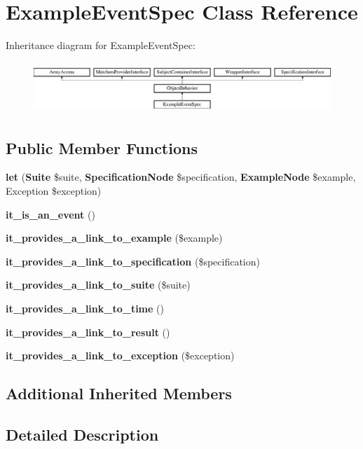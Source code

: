 \section{Example\+Event\+Spec Class Reference}
\label{classspec_1_1_php_spec_1_1_event_1_1_example_event_spec}
Inheritance diagram for Example\+Event\+Spec\+:\begin{figure}[H]
\begin{center}
\leavevmode
\includegraphics[height=1.953488cm]{classspec_1_1_php_spec_1_1_event_1_1_example_event_spec}
\end{center}
\end{figure}
\subsection*{Public Member Functions}
\begin{DoxyCompactItemize}
\item 
{\bf let} ({\bf Suite} \$suite, {\bf Specification\+Node} \$specification, {\bf Example\+Node} \$example, Exception \$exception)
\item 
{\bf it\+\_\+is\+\_\+an\+\_\+event} ()
\item 
{\bf it\+\_\+provides\+\_\+a\+\_\+link\+\_\+to\+\_\+example} (\$example)
\item 
{\bf it\+\_\+provides\+\_\+a\+\_\+link\+\_\+to\+\_\+specification} (\$specification)
\item 
{\bf it\+\_\+provides\+\_\+a\+\_\+link\+\_\+to\+\_\+suite} (\$suite)
\item 
{\bf it\+\_\+provides\+\_\+a\+\_\+link\+\_\+to\+\_\+time} ()
\item 
{\bf it\+\_\+provides\+\_\+a\+\_\+link\+\_\+to\+\_\+result} ()
\item 
{\bf it\+\_\+provides\+\_\+a\+\_\+link\+\_\+to\+\_\+exception} (\$exception)
\end{DoxyCompactItemize}
\subsection*{Additional Inherited Members}


\subsection{Detailed Description}


